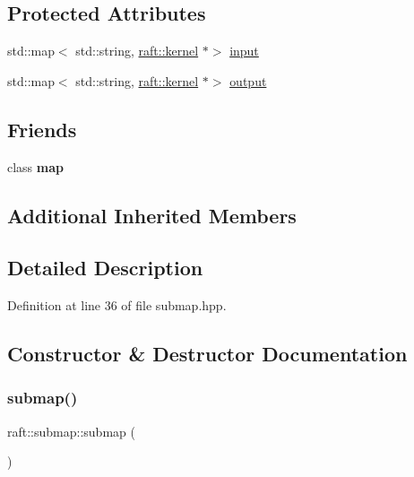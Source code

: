 \subsection*{Protected Attributes}
\begin{DoxyCompactItemize}
\item 
std\+::map$<$ std\+::string, \hyperlink{classraft_1_1kernel}{raft\+::kernel} $\ast$$>$ \hyperlink{classraft_1_1submap_ada5442c9d8489cf9bedc3f4f8aca41bb}{input}
\item 
std\+::map$<$ std\+::string, \hyperlink{classraft_1_1kernel}{raft\+::kernel} $\ast$$>$ \hyperlink{classraft_1_1submap_a565535ee2bcd331c63e32e839ce7d1e8}{output}
\end{DoxyCompactItemize}
\subsection*{Friends}
\begin{DoxyCompactItemize}
\item 
\hypertarget{classraft_1_1submap_aeda338414e516b47761f994fb78056c6}{}\label{classraft_1_1submap_aeda338414e516b47761f994fb78056c6} 
class {\bfseries map}
\end{DoxyCompactItemize}
\subsection*{Additional Inherited Members}


\subsection{Detailed Description}


Definition at line 36 of file submap.\+hpp.



\subsection{Constructor \& Destructor Documentation}
\hypertarget{classraft_1_1submap_a2140e30c3384ee31b8b210b0a6abf398}{}\label{classraft_1_1submap_a2140e30c3384ee31b8b210b0a6abf398} 
\subsubsection{\texorpdfstring{submap()}{submap()}}
{\footnotesize\ttfamily raft\+::submap\+::submap (\begin{DoxyParamCaption}{ }\end{DoxyParamCaption})}

